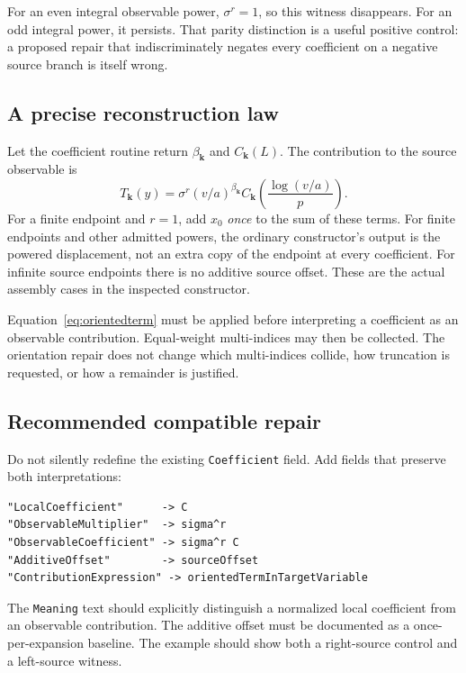 \documentclass[11pt,letterpaper]{article}
\newcommand{\code}[1]{\nolinkurl{#1}}
\begin{document}
For an even integral observable power, \(\sigma^r=1\), so this witness disappears. For an odd integral power, it persists. That parity distinction is a useful positive control: a proposed repair that indiscriminately negates every coefficient on a negative source branch is itself wrong.

\subsection{A precise reconstruction law}
Let the coefficient routine return \(\beta_{\mathbf k}\) and \(C_{\mathbf k}(L)\). The contribution to the source observable is
\begin{equation}
 T_{\mathbf k}(y)=\sigma^r(v/a)^{\beta_{\mathbf k}}
 C_{\mathbf k}\!\left(\frac{\log(v/a)}p\right).
 \label{eq:orientedterm}
\end{equation}
For a finite endpoint and \(r=1\), add \(x_0\) \emph{once} to the sum of these terms. For finite endpoints and other admitted powers, the ordinary constructor's output is the powered displacement, not an extra copy of the endpoint at every coefficient. For infinite source endpoints there is no additive source offset. These are the actual assembly cases in the inspected constructor.\cite{core}

Equation~\eqref{eq:orientedterm} must be applied before interpreting a coefficient as an observable contribution. Equal-weight multi-indices may then be collected. The orientation repair does not change which multi-indices collide, how truncation is requested, or how a remainder is justified.

\subsection{Recommended compatible repair}
Do not silently redefine the existing \code{Coefficient} field. Add fields that preserve both interpretations:
\par\noindent\begin{minipage}{\linewidth}
\begin{lstlisting}
"LocalCoefficient"      -> C
"ObservableMultiplier"  -> sigma^r
"ObservableCoefficient" -> sigma^r C
"AdditiveOffset"        -> sourceOffset
"ContributionExpression" -> orientedTermInTargetVariable
\end{lstlisting}
\end{minipage}\par
The \code{Meaning} text should explicitly distinguish a normalized local coefficient from an observable contribution. The additive offset must be documented as a once-per-expansion baseline. The example should show both a right-source control and a left-source witness.
\end{document}
